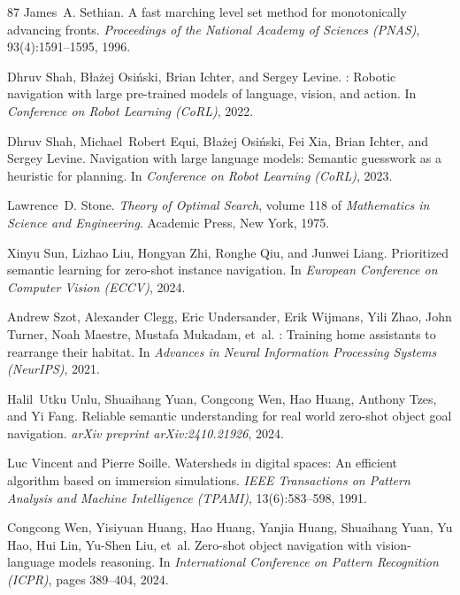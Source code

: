 \documentclass[10pt]{article}
\begin{document}
\begin{thebibliography}{87}
James~A. Sethian.
\newblock A fast marching level set method for monotonically advancing fronts.
\newblock \emph{Proceedings of the National Academy of Sciences (PNAS)}, 93(4):1591--1595, 1996.

Dhruv Shah, B{\l}a{\.z}ej Osi{\'n}ski, Brian Ichter, and Sergey Levine.
: Robotic navigation with large pre-trained models of language, vision, and action.
\newblock In \emph{Conference on Robot Learning (CoRL)}, 2022.

Dhruv Shah, Michael~Robert Equi, B{\l}a{\.z}ej Osi{\'n}ski, Fei Xia, Brian Ichter, and Sergey Levine.
\newblock Navigation with large language models: Semantic guesswork as a heuristic for planning.
\newblock In \emph{Conference on Robot Learning (CoRL)}, 2023.

Lawrence~D. Stone.
\newblock \emph{Theory of Optimal Search}, volume 118 of \emph{Mathematics in Science and Engineering}.
\newblock Academic Press, New York, 1975.

Xinyu Sun, Lizhao Liu, Hongyan Zhi, Ronghe Qiu, and Junwei Liang.
\newblock Prioritized semantic learning for zero-shot instance navigation.
\newblock In \emph{European Conference on Computer Vision (ECCV)}, 2024.

Andrew Szot, Alexander Clegg, Eric Undersander, Erik Wijmans, Yili Zhao, John Turner, Noah Maestre, Mustafa Mukadam, et~al.
: Training home assistants to rearrange their habitat.
\newblock In \emph{Advances in Neural Information Processing Systems (NeurIPS)}, 2021.

Halil~Utku Unlu, Shuaihang Yuan, Congcong Wen, Hao Huang, Anthony Tzes, and Yi Fang.
\newblock Reliable semantic understanding for real world zero-shot object goal navigation.
\newblock \emph{arXiv preprint arXiv:2410.21926}, 2024.

Luc Vincent and Pierre Soille.
\newblock Watersheds in digital spaces: An efficient algorithm based on immersion simulations.
\newblock \emph{IEEE Transactions on Pattern Analysis and Machine Intelligence (TPAMI)}, 13(6):583--598, 1991.

Congcong Wen, Yisiyuan Huang, Hao Huang, Yanjia Huang, Shuaihang Yuan, Yu Hao, Hui Lin, Yu-Shen Liu, et~al.
\newblock Zero-shot object navigation with vision-language models reasoning.
\newblock In \emph{International Conference on Pattern Recognition (ICPR)}, pages 389--404, 2024.


\end{thebibliography}
\end{document}

